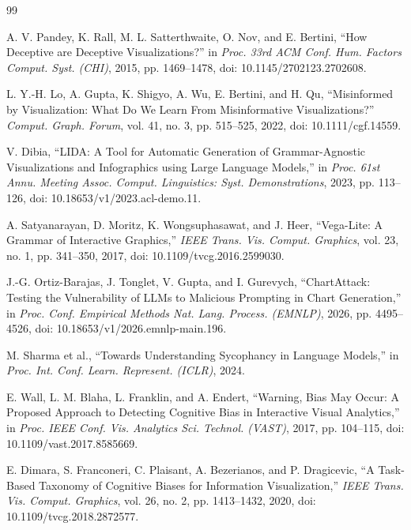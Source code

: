\documentclass[conference]{IEEEtran}
\begin{document}
\begin{thebibliography}{99}
\footnotesize

A. V. Pandey, K. Rall, M. L. Satterthwaite, O. Nov, and E. Bertini, ``How Deceptive are Deceptive Visualizations?'' in \emph{Proc. 33rd ACM Conf. Hum. Factors Comput. Syst. (CHI)}, 2015, pp. 1469--1478, doi: 10.1145/2702123.2702608.

L. Y.-H. Lo, A. Gupta, K. Shigyo, A. Wu, E. Bertini, and H. Qu, ``Misinformed by Visualization: What Do We Learn From Misinformative Visualizations?'' \emph{Comput. Graph. Forum}, vol. 41, no. 3, pp. 515--525, 2022, doi: 10.1111/cgf.14559.

V. Dibia, ``LIDA: A Tool for Automatic Generation of Grammar-Agnostic Visualizations and Infographics using Large Language Models,'' in \emph{Proc. 61st Annu. Meeting Assoc. Comput. Linguistics: Syst. Demonstrations}, 2023, pp. 113--126, doi: 10.18653/v1/2023.acl-demo.11.

A. Satyanarayan, D. Moritz, K. Wongsuphasawat, and J. Heer, ``Vega-Lite: A Grammar of Interactive Graphics,'' \emph{IEEE Trans. Vis. Comput. Graphics}, vol. 23, no. 1, pp. 341--350, 2017, doi: 10.1109/tvcg.2016.2599030.

J.-G. Ortiz-Barajas, J. Tonglet, V. Gupta, and I. Gurevych, ``ChartAttack: Testing the Vulnerability of LLMs to Malicious Prompting in Chart Generation,'' in \emph{Proc. Conf. Empirical Methods Nat. Lang. Process. (EMNLP)}, 2026, pp. 4495--4526, doi: 10.18653/v1/2026.emnlp-main.196.

M. Sharma et al., ``Towards Understanding Sycophancy in Language Models,'' in \emph{Proc. Int. Conf. Learn. Represent. (ICLR)}, 2024.

E. Wall, L. M. Blaha, L. Franklin, and A. Endert, ``Warning, Bias May Occur: A Proposed Approach to Detecting Cognitive Bias in Interactive Visual Analytics,'' in \emph{Proc. IEEE Conf. Vis. Analytics Sci. Technol. (VAST)}, 2017, pp. 104--115, doi: 10.1109/vast.2017.8585669.

E. Dimara, S. Franconeri, C. Plaisant, A. Bezerianos, and P. Dragicevic, ``A Task-Based Taxonomy of Cognitive Biases for Information Visualization,'' \emph{IEEE Trans. Vis. Comput. Graphics}, vol. 26, no. 2, pp. 1413--1432, 2020, doi: 10.1109/tvcg.2018.2872577.


\end{thebibliography}
\end{document}
